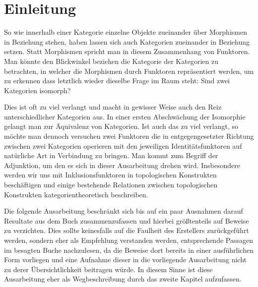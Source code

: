 \section*{Einleitung}

So wie innerhalb einer Kategorie einzelne Objekte zueinander über Morphismen in Beziehung stehen, haben lassen sich auch Kategorien zueinander in Beziehung setzen. Statt Morphismen spricht man in diesem Zusammenhang von Funktoren. Man könnte den Blickwinkel beziehen die Kategorie der Kategorien zu betrachten, in welcher die Morphismen durch Funktoren repräsentiert werden, um zu erkennen dass letztlich wieder dieselbe Frage im Raum steht: Sind zwei Kategorien isomorph? 

Dies ist oft zu viel verlangt und macht in gewisser Weise auch den Reiz unterschiedlicher Kategorien aus. In einer ersten Abschwächung der Isomorphie gelangt man zur Äquivalenz von Kategorien. Ist auch das zu viel verlangt, so möchte man dennoch versuchen zwei Funktoren die in entgegengesetzter Richtung zwischen zwei Kategorien operieren mit den jeweiligen Identitätsfunktoren auf natürliche Art in Verbindung zu bringen. Man kommt zum Begriff der Adjunktion, um den es sich in dieser Ausarbeitung drehen wird. Insbesondere werden wir uns mit Inklusionsfunktoren in topologischen Konstrukten beschäftigen und einige bestehende Relationen zwischen topologischen Konstrukten kategorientheoretisch beschreiben.

Die folgende Ausarbeitung beschränkt sich bis auf ein paar Ausnahmen darauf Resultate aus dem Buch \cite{preuss} zusammenzufassen und hierbei größtenteils auf Beweise zu verzichten. 
Dies sollte keinesfalls auf die Faulheit des Erstellers zurückgeführt werden, sondern eher als Empfehlung verstanden werden, entsprechende Passagen im besagten Buche nachzulesen, da die Beweise dort bereits in einer ausführlichen Form vorliegen und eine Aufnahme dieser in die vorliegende Ausarbeitung nicht zu derer Übersichtlichkeit beitragen würde.
In diesem Sinne ist diese Ausarbeitung eher als Wegbeschreibung durch das zweite Kapitel aufzufassen.
